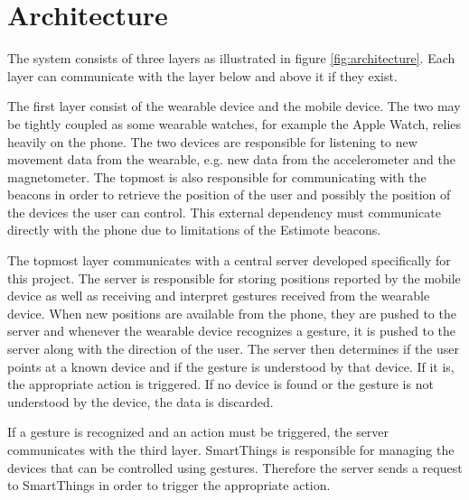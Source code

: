 \section{Architecture}

The system consists of three layers as illustrated in figure \ref{fig:architecture}. Each layer can communicate with the layer below and above it if they exist.

The first layer consist of the wearable device and the mobile device. The two may be tightly coupled as some wearable watches, for example the Apple Watch, relies heavily on the phone. The two devices are responsible for listening to new movement data from the wearable, e.g. new data from the accelerometer and the magnetometer. The topmost is also responsible for communicating with the beacons in order to retrieve the position of the user and possibly the position of the devices the user can control. This external dependency must communicate directly with the phone due to limitations of the Estimote beacons.

The topmost layer communicates with a central server developed specifically for this project. The server is responsible for storing positions reported by the mobile device as well as receiving and interpret gestures received from the wearable device.
When new positions are available from the phone, they are pushed to the server and whenever the wearable device recognizes a gesture, it is pushed to the server along with the direction of the user.
The server then determines if the user points at a known device and if the gesture is understood by that device. If it is, the appropriate action is triggered. If no device is found or the gesture is not understood by the device, the data is discarded.


If a gesture is recognized and an action must be triggered, the server communicates with the third layer. SmartThings is responsible for managing the devices that can be controlled using gestures. Therefore the server sends a request to SmartThings in order to trigger the appropriate action.

